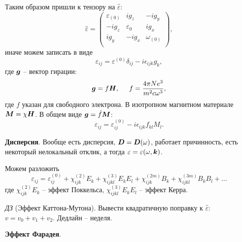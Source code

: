Таким образом пришли к тензору на $\hat{\varepsilon}$:
\begin{equation*}
    \hat{\varepsilon} = \begin{pmatrix}
        \varepsilon_{(0)}  & i g_z & -i g_y \\
        -i g_z & \varepsilon_0 & i g_x \\
        i g_y & - i g_x & \omega_{(0)} \\
    \end{pmatrix},
\end{equation*}
иначе можем записать в виде
\begin{equation*}
    \varepsilon_{ij} = \varepsilon^{(0)} \delta_{ij} -i \epsilon_{ijk} g_k,
\end{equation*}
где $\mbox{\boldmath $g$}$ -- вектор гирации:
\begin{equation*}
    \mbox{\boldmath $g$} = f \mbox{\boldmath $H$},
    \hspace{5 mm} 
    f = \frac{4 \pi N e^3}{m^2 c \omega^3},
\end{equation*}
где $f$ указан для свободного электрона. 
В изотропном магнитном материале $\mbox{\boldmath $M$} = \chi \mbox{\boldmath $H$}$.
В общем виде $\mbox{\boldmath $g$} = \hat{f} \mbox{\boldmath $M$}$:
\begin{equation*}
    \varepsilon_{ij} = \varepsilon_{ij}^{(0)} - i \epsilon_{ijk} f_{kl} M_l.
\end{equation*}

\textbf{Дисперсия}. Вообще есть дисперсия, $\mbox{\boldmath $D$} = \mbox{\boldmath $D$}(\omega)$, работает причинность, есть некоторый нелокальный отклик, а тогда
$\varepsilon = \varepsilon(\omega, \mbox{\boldmath $k$})$. 

Можем разложить
\begin{equation*}
    \varepsilon_{ij} = \varepsilon_{ij}^{(0)} + \chi_{ijk}^{(2)} E_k + \chi^{(3)}_{ijkl} E_k E_l + \chi^{(2m)}_{ijk} B_k + \chi_{ijkl}^{(3m)} B_k B_l + \ldots
\end{equation*}
где $\chi_{ijk}^{(2)} E_k$ -- эффект Поккельса, $\chi^{(3)}_{ijkl} E_k E_l$ -- эффект Керра.




\noindent
\textit{ДЗ} (Эффект Каттона-Мутона). Вывести квадратичную поправку к $\hat{\varepsilon}$: $v = v_0 + v_1 + v_2$. Дедлайн -- неделя.

\textbf{Эффект Фарадея}. 